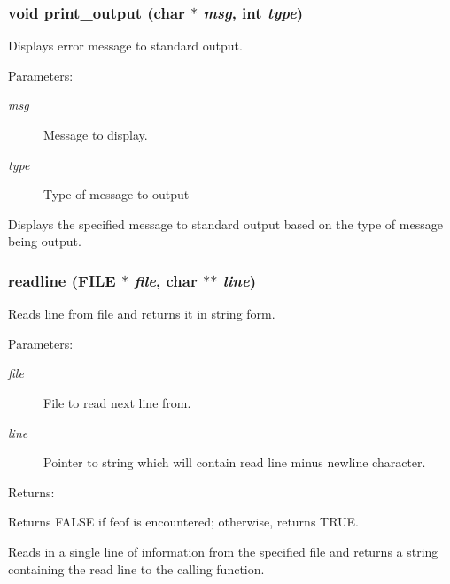 \subsubsection{\setlength{\rightskip}{0pt plus 5cm}void print\_\-output (char $\ast$ {\em msg}, int {\em type})}\label{util_8h_a2}


Displays error message to standard output.

\begin{Desc}
\item[Parameters: ]\par
\begin{description}
\item[{\em 
msg}]Message to display. \item[{\em 
type}]Type of message to output\end{description}
\end{Desc}
Displays the specified message to standard output based on the type of message being output. 
\subsubsection{ readline (FILE $\ast$ {\em file}, char $\ast$$\ast$ {\em line})}\label{util_8h_a8}


Reads line from file and returns it in string form.

\begin{Desc}
\item[Parameters: ]\par
\begin{description}
\item[{\em 
file}]File to read next line from. \item[{\em 
line}]Pointer to string which will contain read line minus newline character.\end{description}
\end{Desc}
\begin{Desc}
\item[Returns: ]\par
Returns FALSE if feof is encountered; otherwise, returns TRUE.\end{Desc}
Reads in a single line of information from the specified file and returns a string containing the read line to the calling function. 
